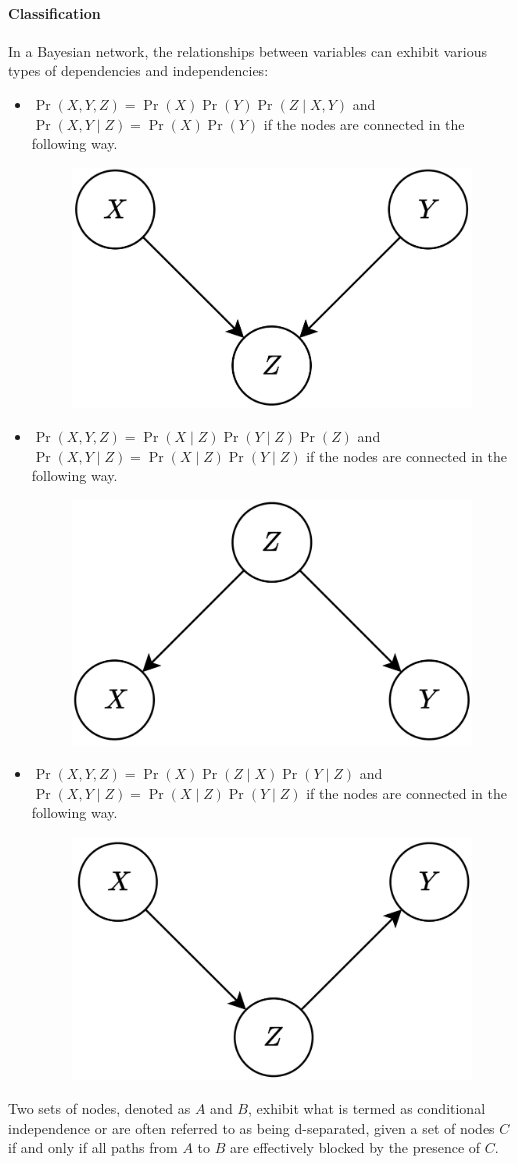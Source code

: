 \paragraph*{Classification}
In a Bayesian network, the relationships between variables can exhibit various types of dependencies and independencies: 
\begin{itemize}
    \item $\Pr(X,Y,Z)=\Pr(X)\Pr(Y)\Pr(Z\mid X,Y)$ and $\Pr(X,Y\mid Z)=\Pr(X)\Pr(Y)$ if the nodes are connected in the following way. 
        \begin{figure}[H]
            \centering
            \includegraphics[width=0.3\linewidth]{images/independencies1.png}
        \end{figure}
    \item $\Pr(X,Y,Z)=\Pr(X\mid Z)\Pr(Y\mid Z)\Pr(Z)$ and $\Pr(X,Y\mid Z)=\Pr(X\mid Z)\Pr(Y\mid Z)$ if the nodes are connected in the following way. 
        \begin{figure}[H]
            \centering
            \includegraphics[width=0.3\linewidth]{images/independencies2.png}
        \end{figure}
    \item $\Pr(X,Y,Z)=\Pr(X)\Pr(Z\mid X)\Pr(Y\mid Z)$ and $\Pr(X,Y\mid Z)=\Pr(X\mid Z)\Pr(Y\mid Z)$ if the nodes are connected in the following way. 
        \begin{figure}[H]
            \centering
            \includegraphics[width=0.3\linewidth]{images/independencies3.png}
        \end{figure}
\end{itemize}
\begin{definition}
    Two sets of nodes, denoted as $A$ and $B$, exhibit what is termed as conditional independence or are often referred to as being d-separated, given a set of nodes $C$ if and only if all paths from $A$ to $B$ are effectively blocked by the presence of $C$.
\end{definition}
